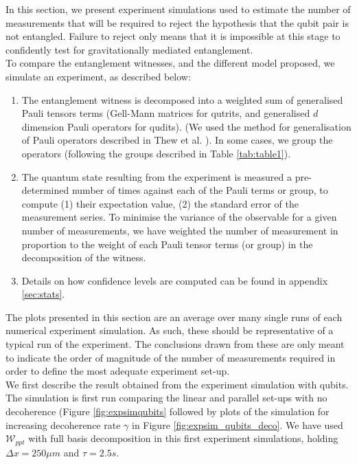 \documentclass[%
 reprint,
 superscriptaddress,
 amsmath,
 amssymb,
 aps,
 longbibliography
]{revtex4-2}
\begin{document}
\indent In this section, we present experiment simulations used to estimate the number of measurements that will be required to reject the hypothesis that the qubit pair is not entangled. Failure to reject only means that it is impossible at this stage to confidently test for gravitationally mediated entanglement. \\
\indent To compare the entanglement witnesses, and the different model proposed, we simulate an experiment, as described below: 
	\begin{enumerate}
		\item The entanglement witness is decomposed into a weighted sum of generalised Pauli tensors terms (Gell-Mann matrices for qutrits, and generalised $d$ dimension Pauli operators for qudits). (We used the method for generalisation of Pauli operators described in Thew et al. \cite{Thew2002}). In some cases, we group the operators (following the groups described in Table \ref{tab:table1}).
		\item The quantum state resulting from the experiment is measured a pre-determined number of times against each of the Pauli terms or group, to compute (1) their expectation value, (2) the standard error of the measurement series. To minimise the variance of the observable for a given number of measurements, we have weighted the number of measurement in proportion to the weight of each Pauli tensor terms (or group) in the decomposition of the witness.
		\item Details on how confidence levels are computed can be found in appendix \ref{sec:stats}.
	\end{enumerate}
\indent The plots presented in this section are an average over many single runs of each numerical experiment simulation. As such, these should be representative of a typical run of the experiment. The conclusions drawn from these are only meant to indicate the order of magnitude of the number of measurements required in order to define the most adequate experiment set-up. \\
\indent We first describe the result obtained from the experiment simulation with qubits. The simulation is first run comparing the linear and parallel set-ups with no decoherence (Figure \ref{fig:expsimqubits} followed by plots of the simulation for increasing decoherence rate $\gamma$  in Figure \ref{fig:expsim_qubits_deco}. We have used $\mathcal{W}_{ppt}$ with full basis decomposition in this first experiment simulations, holding $\Delta x = 250 \mu m$ and $\tau = 2.5s$.\\
\end{document}
